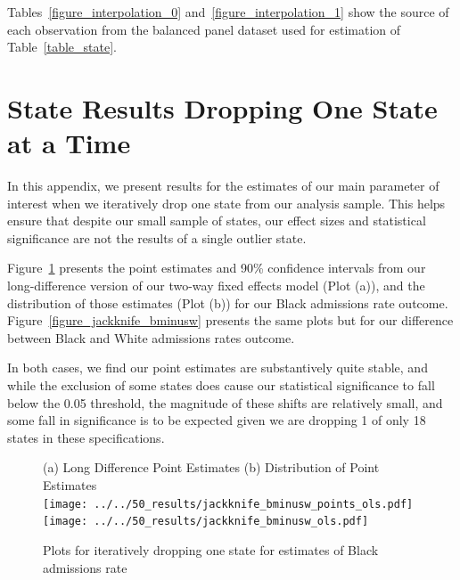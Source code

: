 \documentclass[12pt]{article}
\begin{document}
 Tables~\ref{figure_interpolation_0} and~\ref{figure_interpolation_1} show the source of each observation from the balanced panel dataset used for estimation of Table~\ref{table_state}.

 
 




\section{State Results Dropping One State at a Time}\label{appendix_jackknife}
\setcounter{table}{0}
\setcounter{figure}{0}
\renewcommand{\thetable}{F\arabic{table}}
\renewcommand{\thefigure}{F\arabic{figure}}
\normalsize

In this appendix, we present results for the estimates of our main parameter of interest when we iteratively drop one state from our analysis sample.  This helps ensure that despite our small sample of states, our effect sizes and statistical significance are not the results of a single outlier state.

Figure~\ref{figure_jackknife_black} presents the point estimates and 90\% confidence intervals from our long-difference version of our two-way fixed effects model (Plot (a)), and the distribution of those estimates (Plot (b)) for our Black admissions rate outcome. Figure~\ref{figure_jackknife_bminusw} presents the same plots but for our difference between Black and White admissions rates outcome.

In both cases, we find our point estimates are substantively quite stable, and while the exclusion of some states does cause our statistical significance to fall below the 0.05 threshold, the magnitude of these shifts are relatively small, and some fall in significance is to be expected given we are dropping 1 of only 18 states in these specifications.

\begin{figure}[h!]
 	\begin{center}
 	\caption{ Plots for iteratively dropping one state for estimates of Black admissions rate }
 	\small
		(a) Long Difference Point Estimates \hspace*{.4in} (b) Distribution of Point Estimates \\
 			\texttt{[image: ../../50\_results/jackknife\_bminusw\_points\_ols.pdf]}
 			\texttt{[image: ../../50\_results/jackknife\_bminusw\_ols.pdf]} \\
       \smallskip
       \label{figure_jackknife_black}
       \end{center}
\end{figure} \normalsize
\end{document}
